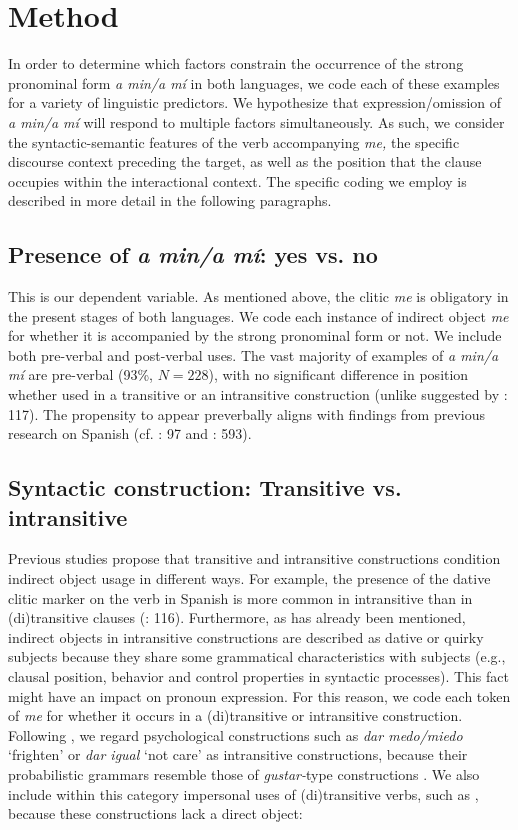 \documentclass[output=paper]{langscibook}
\begin{document}
\section{Method}

In order to determine which factors constrain the occurrence of the strong pronominal form \textit{a min\slash a mí} in both languages, we code each of these examples for a variety of linguistic predictors. We hypothesize that expression/omission of \textit{a min\slash a mí} will respond to multiple factors simultaneously. As such, we consider the syntactic-semantic features of the verb accompanying \textit{me,} the specific discourse context preceding the target, as well as the position that the clause occupies within the interactional context. The specific coding we employ is described in more detail in the following paragraphs.

\subsection{Presence of \textit{a min\slash a mí}: yes vs. no}
This is our dependent variable. As mentioned above, the clitic \textit{me} is obligatory in the present stages of both languages. We code each instance of indirect object \textit{me} for whether it is accompanied by the strong pronominal form or not. We include both pre-verbal and post-verbal uses. The vast majority of examples of \textit{a min\slash a mí} are pre-verbal (93\%, $N=228$), with no significant difference in position whether used in a transitive or an intransitive construction (unlike suggested by \citealt{DufterStark2008}: 117). The propensity to appear preverbally aligns with findings from previous research on Spanish (cf.  \citealt{VázquezRozas2006}: 97 and \citealt{AijónOliva2018}: 593).  

\subsection{Syntactic construction: Transitive vs. intransitive}\largerpage[-1]
Previous studies propose that transitive and intransitive constructions condition indirect object usage in different ways. For example, the presence of the dative clitic marker on the verb in Spanish is more common in intransitive than in (di)transitive clauses (\citealt{DufterStark2008}: 116). Furthermore, as has already been mentioned, indirect objects in intransitive constructions are described as dative or quirky subjects because they share some grammatical characteristics with subjects (e.g., clausal position, behavior and control properties in syntactic processes). This fact might have an impact on pronoun expression. For this reason, we code each token of \textit{me} for whether it occurs in a (di)transitive or intransitive construction. Following \citet{SotoAndión2008}, we regard psychological constructions such as \textit{dar medo/miedo} ‘frighten’ or \textit{dar igual} ‘not care’ as intransitive constructions, because their probabilistic grammars resemble those of \textit{gustar-}type constructions \citep{Rivas2016}. We also include within this category impersonal uses of (di)transitive verbs, such as , because these constructions lack a direct object:
\end{document}
